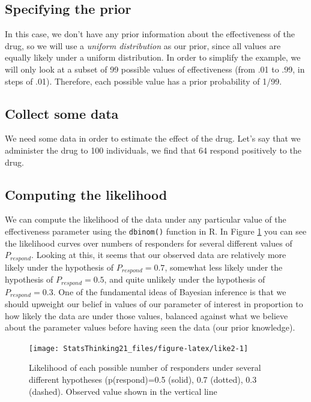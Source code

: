 \documentclass[12pt,]{book}
\theoremstyle{definition}
\theoremstyle{definition}
\theoremstyle{definition}
\theoremstyle{remark}
\begin{document}
\hypertarget{specifying-the-prior-1}{%
\subsection{Specifying the prior}\label{specifying-the-prior-1}}

In this case, we don't have any prior information about the effectiveness of the drug, so we will use a \emph{uniform distribution} as our prior, since all values are equally likely under a uniform distribution. In order to simplify the example, we will only look at a subset of 99 possible values of effectiveness (from .01 to .99, in steps of .01). Therefore, each possible value has a prior probability of 1/99.

\hypertarget{collect-some-data-1}{%
\subsection{Collect some data}\label{collect-some-data-1}}

We need some data in order to estimate the effect of the drug. Let's say that we administer the drug to 100 individuals, we find that 64 respond positively to the drug.

\hypertarget{computing-the-likelihood-1}{%
\subsection{Computing the likelihood}\label{computing-the-likelihood-1}}

We can compute the likelihood of the data under any particular value of the effectiveness parameter using the \texttt{dbinom()} function in R. In Figure \ref{fig:like2} you can see the likelihood curves over numbers of responders for several different values of \(P_{respond}\). Looking at this, it seems that our observed data are relatively more likely under the hypothesis of \(P_{respond}=0.7\), somewhat less likely under the hypothesis of \(P_{respond}=0.5\), and quite unlikely under the hypothesis of \(P_{respond}=0.3\). One of the fundamental ideas of Bayesian inference is that we should upweight our belief in values of our parameter of interest in proportion to how likely the data are under those values, balanced against what we believe about the parameter values before having seen the data (our prior knowledge).

\begin{figure}
\texttt{[image: StatsThinking21\_files/figure-latex/like2-1]} \caption{Likelihood of each possible number of responders under several different hypotheses (p(respond)=0.5 (solid), 0.7 (dotted), 0.3 (dashed).  Observed value shown in the vertical line}\label{fig:like2}
\end{figure}
\end{document}
